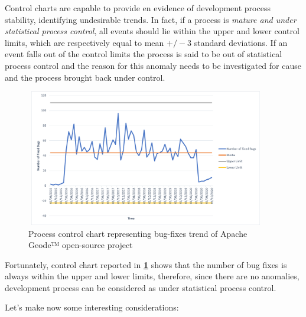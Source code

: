 \documentclass[sigconf]{acmart}
\begin{document}
Control charts are capable to provide en evidence of development process stability, identifying undesirable trends. In fact, if a process is \textit{mature and under statistical process control}, all events should lie within the upper and lower control limits, which are respectively equal to mean $+/-3$ standard deviations. If an event falls out of the control limits the process is said to be out of statistical process control and the reason for this anomaly needs to be investigated for cause and the process brought back under control. 

\begin{figure}[h!]
  \centering
  \includegraphics[width=10.5cm, height=6cm]{./ProcessControlChart.png}
  \caption{Process control chart representing bug-fixes trend of Apache Geode™ open-source project}
  \label{ProcessControl}
\end{figure}

Fortunately, control chart reported in \textbf{\cref{ProcessControl}} shows that the number of bug fixes is always within the upper and lower limits, therefore, since there are no anomalies, development process can be considered as under statistical process control.

Let's make now some interesting considerations:
\end{document}
